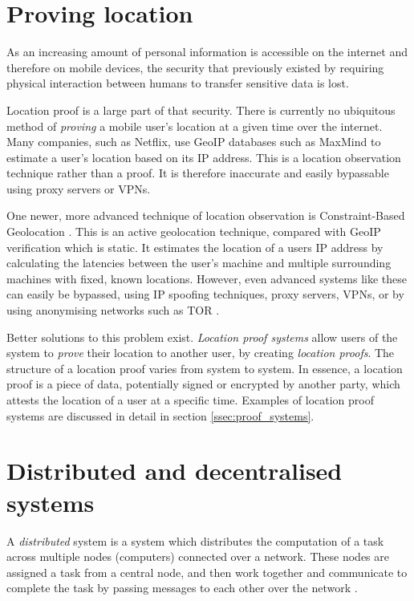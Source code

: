 \section{Proving location}
As an increasing amount of personal information is accessible on the internet and therefore on mobile devices, the security that previously existed by requiring physical interaction between humans to transfer sensitive data is lost.

Location proof is a large part of that security. There is currently no ubiquitous method of \textit{proving} a mobile user's location at a given time over the internet. Many companies, such as Netflix, use GeoIP databases such as MaxMind \cite{maxmind} to estimate a user's location based on its IP address. This is a location observation technique rather than a proof. It is therefore inaccurate and easily bypassable using proxy servers or VPNs.

One newer, more advanced technique of location observation is Constraint-Based Geolocation \cite{constraint-based}. This is an active geolocation technique, compared with GeoIP verification which is static. It estimates the location of a users IP address by calculating the latencies between the user's machine and multiple surrounding machines with fixed, known locations. However, even advanced systems like these can easily be bypassed, using IP spoofing techniques, proxy servers, VPNs, or by using anonymising networks such as TOR \cite{tor}.

Better solutions to this problem exist. \textit{Location proof systems} allow users of the system to \textit{prove} their location to another user, by creating \textit{location proofs}. The structure of a location proof varies from system to system. In essence, a location proof is a piece of data, potentially signed or encrypted by another party, which attests the location of a user at a specific time. Examples of location proof systems are discussed in detail in section \ref{ssec:proof_systems}.

\section{Distributed and decentralised systems}
A \textit{distributed} system is a system which distributes the computation of a task across multiple nodes (computers) connected over a network. These nodes are assigned a task from a central node, and then work together and communicate to complete the task by passing messages to each other over the network \cite{distributed}.

